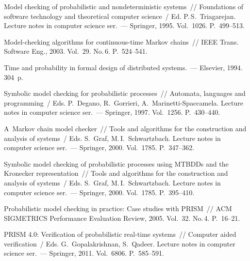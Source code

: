 \begin{multicols}{2}
{{\begin{thebibliography}{99}
 Model checking of probabilistic and
nondeterministic systems~// Foundations of software technology and
theoretical computer science~/
Ed. P.\,S.~Triagarejan.  Lecture notes in computer science ser.~---
Springer, 1995.  Vol.~1026. P.~499--513.

Model-checking algorithms for continuous-time Markov chains~// IEEE
Trans. Software Eng., 2003. Vol.~29. No.\,6.
P.~524--541.

 Time and probability in formal design of
distributed systems.~--- Elsevier, 1994. 304~p.

 Symbolic model checking for probabilistic processes~//
Automata, languages and programming~/ Eds. P.~Degano, R.~Gorrieri, A.~Marinetti-Spaccamela.
Lecture notes in computer science ser.~--- Springer,
1997.  Vol.~1256. P.~430--440.

A~Markov chain model checker~// Tools and algorithms for the construction and
analysis of systems~/
Eds. S.~Graf, M.\,I.~Schwartzbach.
Lecture notes in computer science ser.~--- Springer, 2000.
 Vol.~1785. P.~347--362.

Symbolic model checking of probabilistic processes using MTBDDs and
the Kronecker representation~//
Tools and algorithms for the construction and analysis
of systems~/
Eds. S.~Graf, M.\,I.~Schwartzbach. Lecture notes in computer science ser.~--- Springer, 2000.
 Vol.~1785. P.~395--410.



 Probabilistic model
checking in practice: Case studies with PRISM~// ACM SIGMETRICS
Performance Evaluation Review, 2005. Vol.~32. No.\,4. P.~16--21.

 PRISM 4.0: Verification
of probabilistic real-time systems~//
 Computer aided verification~/
 Eds. G.~Gopalakrishnan, S.~Qadeer.
Lecture notes in computer science ser.~--- Springer, 2011. Vol.~6806. P.~585--591.

 \end{thebibliography}

 }
 }

\end{multicols}


